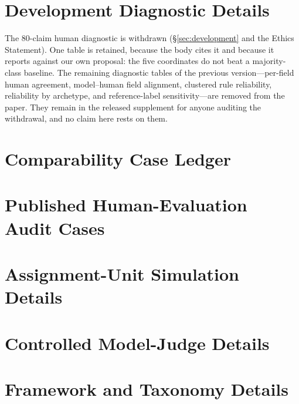 \documentclass[11pt]{article}
\begin{document}
\section{Development Diagnostic Details}
The 80-claim human diagnostic is withdrawn (\S\ref{sec:development} and the
Ethics Statement). One table is retained, because the body cites it and because
it reports against our own proposal: the five coordinates do not beat a
majority-class baseline. The remaining diagnostic tables of the previous
version---per-field human agreement, model--human field alignment, clustered
rule reliability, reliability by archetype, and reference-label
sensitivity---are removed from the paper. They remain in the released
supplement for anyone auditing the withdrawal, and no claim here rests on them.


\FloatBarrier
\section{Comparability Case Ledger}
\label{sec:appendix-cases}



\FloatBarrier
\section{Published Human-Evaluation Audit Cases}



\FloatBarrier


\FloatBarrier
\section{Assignment-Unit Simulation Details}






\FloatBarrier
\section{Controlled Model-Judge Details}
\label{sec:appendix-cmj}


\FloatBarrier
\section{Framework and Taxonomy Details}








\end{document}
